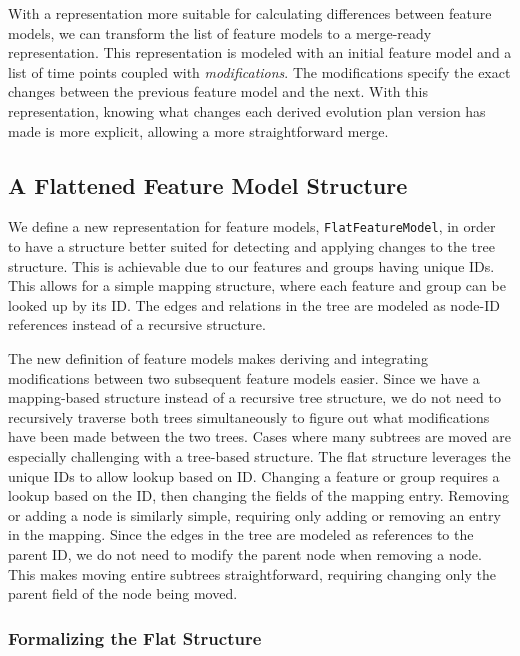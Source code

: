 \documentclass[a4paper,english]{ifimaster}
\begin{document}
With a representation more suitable for calculating differences between feature models, we can transform the list of feature models to a merge-ready representation. This representation is modeled with an initial feature model and a list of time points coupled with \textit{modifications}. The modifications specify the exact changes between the previous feature model and the next. With this representation, knowing what changes each derived evolution plan version has made is more explicit, allowing a more straightforward merge.

\subsection{A Flattened Feature Model Structure}%
\label{sub:a_flatter_feature_model_structure}

We define a new representation for feature models, \texttt{FlatFeatureModel}, in order to have a structure better suited for detecting and applying changes to the tree structure. This is achievable due to our features and groups having unique IDs. This allows for a simple mapping structure, where each feature and group can be looked up by its ID. The edges and relations in the tree are modeled as node-ID references instead of a recursive structure.

The new definition of feature models makes deriving and integrating modifications between two subsequent feature models easier. Since we have a mapping-based structure instead of a recursive tree structure, we do not need to recursively traverse both trees simultaneously to figure out what modifications have been made between the two trees. Cases where many subtrees are moved are especially challenging with a tree-based structure. The flat structure leverages the unique IDs to allow lookup based on ID. Changing a feature or group requires a lookup based on the ID, then changing the fields of the mapping entry. Removing or adding a node is similarly simple, requiring only adding or removing an entry in the mapping. Since the edges in the tree are modeled as references to the parent ID, we do not need to modify the parent node when removing a node. This makes moving entire subtrees straightforward, requiring changing only the parent field of the node being moved.

\subsubsection{Formalizing the Flat Structure}%
\label{ssub:formalizing_the_flat_structure}
\end{document}
